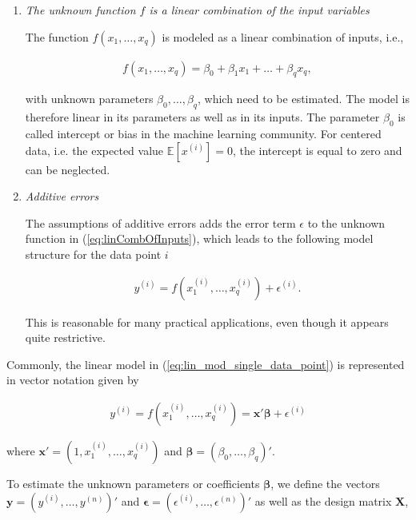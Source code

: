 \documentclass[10pt,a4paper]{article}
\begin{document}
\begin{enumerate}
	\item \emph{The unknown function $f$ is a linear combination of the input variables}
	
	The function $f(x_1, \dots, x_q)$ is modeled as a linear combination of inputs, i.e.,
	
	\begin{align} \label{eq:linCombOfInputs}
		f(x_1, \dots, x_q) = \beta_0 + \beta_1 x_1 + \dots + \beta_q x_q,
	\end{align}
	
	with unknown parameters $\beta_0, \dots, \beta_q$, which need to be estimated. The model is therefore linear in its parameters as well as in its inputs. \cite{bishop2006patternRecognition} The parameter $\beta_0$ is called intercept or bias in the machine learning community. For centered data, i.e. the expected value $\mathbb{E}[x^{(i)}] = 0$, the intercept is equal to zero and can be neglected.
		
	\item \emph{Additive errors}
	
	The assumptions of additive errors adds the error term $\epsilon$ to the unknown function in (\ref{eq:linCombOfInputs}), which leads to the following model structure for the data point $i$
	
	\begin{align} \label{eq:linModelOneDim}
		y^{(i)} = f(x^{(i)}_1, \dots, x^{(i)}_q) + \epsilon^{(i)}.
	\end{align}

	This is reasonable for many practical applications, even though it appears quite restrictive. 
\end{enumerate}

Commonly, the linear model in (\ref{eq:lin_mod_single_data_point}) is represented in vector notation given by

\begin{align} \label{eq:lin_mod_sp_vec_notation}
	 y^{(i)} = f(x^{(i)}_{1}, \dots, x^{(i)}_{q})  = \boldsymbol{x}' \boldsymbol{\beta} + \epsilon^{(i)}
\end{align}

where $\boldsymbol{x}' = (1, x^{(i)}_{1}, \dots, x^{(i)}_{q})$ and $\boldsymbol{\beta} = (\beta_0, \dots, \beta_q)'$.

To estimate the unknown parameters or coefficients $\boldsymbol{\beta}$, we define the vectors $\boldsymbol{y} = (y^{(i)}, \dots, y^{(n)})'$ and $\boldsymbol{\epsilon} = (\epsilon^{(i)}, \dots, \epsilon^{(n)})'$ as well as the design matrix $\boldsymbol{X}$, 
\end{document}
